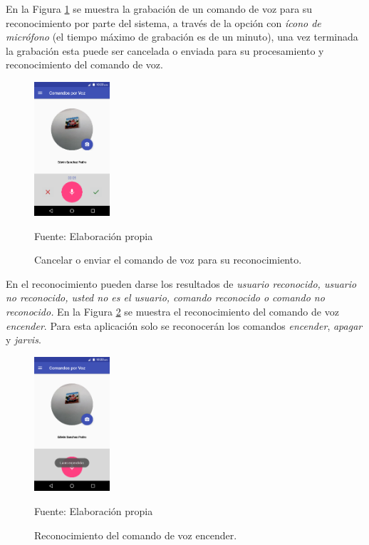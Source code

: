 En la Figura \ref{fig:figura3.50} se muestra la grabación de un comando de voz para su reconocimiento por parte del sistema, a través de la opción con \textit{ícono de micrófono} (el tiempo máximo de grabación es de un minuto), una vez terminada la grabación esta puede ser cancelada o enviada para su procesamiento y reconocimiento del comando de voz.
\begin{figure}[H]
\captionsetup{justification=centering}
\begin{center}
\includegraphics[width=0.25\textwidth]{Imagenes/Cap3/image050}
\end{center}
\begin{center}
\vskip -0.5cm
\caption{\small{Cancelar o enviar el comando de voz para su reconocimiento.}}
\label{fig:figura3.50}
{\small{Fuente: Elaboración propia}}
\end{center}
\end{figure}

En el reconocimiento pueden darse los resultados de \textit{usuario reconocido, usuario no reconocido, usted no es el usuario, comando reconocido o comando no reconocido.} En la Figura \ref{fig:figura3.51} se muestra el reconocimiento del comando de voz \textit{encender}. Para esta aplicación solo se reconocerán los comandos \textit{encender}, \textit{apagar} y \textit{jarvis}.
\begin{figure}[H]
\captionsetup{justification=centering}
\begin{center}
\includegraphics[width=0.25\textwidth]{Imagenes/Cap3/image051}
\end{center}
\begin{center}
\vskip -0.5cm
\caption{\small{Reconocimiento del comando de voz encender.}}
\label{fig:figura3.51}
{\small{Fuente: Elaboración propia}}
\end{center}
\end{figure}

